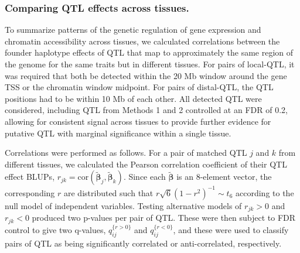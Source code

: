 \documentclass[9pt,twocolumn,twoside]{gsajnl}
\newcommand{\bbeta}{\boldsymbol{\beta}}
\newcommand{\blup}{\widetilde{\bbeta}}
\newcommand{\bzero}{\mathbf{0}}
\newcommand{\bI}{\mathbf{I}}
\newcommand{\bx}{\mathbf{x}}
\newcommand{\tausq}{\tau^{2}}
\begin{document}

\subsubsection{Comparing QTL effects across tissues.}

To summarize patterns of the genetic regulation of gene expression and chromatin accessibility across tissues, we calculated correlations between the founder haplotype effects of QTL that map to approximately the same region of the genome for the same traits but in different tissues. For pairs of local-QTL, it was required that both be detected within the 20 Mb window around the gene TSS or the chromatin window midpoint. For pairs of distal-QTL, the QTL positions had to be within 10 Mb of each other. All detected QTL were considered, including QTL from Methods 1 and 2 controlled at an FDR of 0.2, allowing for consistent signal across tissues to provide further evidence for putative QTL with marginal significance within a single tissue.

Correlations were performed as follows. For a pair of matched QTL $j$ and $k$ from different tissues, we calculated the Pearson correlation coefficient of their QTL effect BLUPs, $r_{jk} = \text{cor}(\blup_j, \blup_k)$. Since each $\blup$ is an 8-element vector, the corresponding $r$ are distributed such that $r\sqrt{6}(1 - r^{2})^{-1} \sim t_{6}$ according to the null model of independent variables. Testing alternative models of $r_{jk} > 0$ and $r_{jk} < 0$ produced two p-values per pair of QTL. These were then subject to FDR control \citep{Benjamini1995} to give two q-values, $q_{ij}^{\{r > 0\}}$ and $q_{ij}^{\{r < 0\}}$, and these were used to classify pairs of QTL as being significantly correlated or anti-correlated, respectively. 
\end{document}
